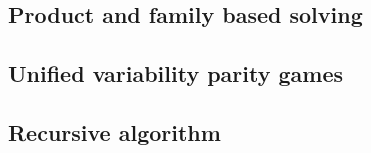 \subsection{Product and family based solving}


\subsection{Unified variability parity games}
\label{sec_unified_pg}


\subsection{Recursive algorithm}
